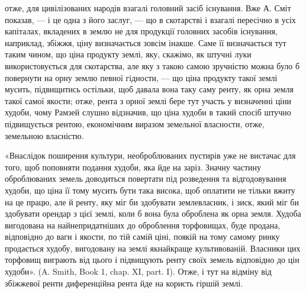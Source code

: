 \parcont{}  %
отже, для цивілізованих народів взагалі головний засіб існування. Вже А. Сміт
показав, — і це одна з його заслуг, — що в скотарстві і взагалі пересічно в
усіх капіталах, вкладених в землю не для продукції головних засобів існування,
наприклад, збіжжя, ціну визначається зовсім інакше. Саме її визначається
тут таким чином, що ціна продукту землі, яку, скажімо, як штучні луки використовується
для скотарства, але яку з такою самою зручністю можна було б
повернути на орну землю певної гідности, — що ціна продукту такої землі мусить,
підвищитись остільки, щоб давала вона таку саму ренту, як орна земля такої
самої якости; отже, рента з орної землі бере тут участь у визначенні ціни худоби,
чому Рамзей слушно відзначив, що ціна худоби в такий спосіб штучно
підвищується рентою, економічним виразом земельної власности, отже, земельною
власністю.

«Внаслідок поширення культури, необроблюваних пустирів уже не вистачає
для того, щоб поповняти подання худоби, яка йде на заріз. Значну частину
оброблюваних земель доводиться повертати під розведення та відгодовування
худоби, що ціна її тому мусить бути така висока, щоб оплатити не
тільки вжиту на це працю, але й ренту, яку міг би здобувати землевласник,
і зиск, який міг би здобувати орендар з цієї землі, коли б вона була
оброблена як орна земля. Худоба вигодована на найнепридатніших до оброблення
торфовищах, буде продана, відповідно до ваги і якости, по тій самій ціні, поякій
на тому самому ринку продається худобу, вигодовану на землі якнайкраще
культивованій. Власники цих торфовищ виграють від цього і підвищують ренту
своїх земель відповідно до цін худоби». (A. Smith, Book 1, chap. XI, part. I).
Отже, і тут на відміну від збіжжевої ренти диференційна рента йде на користь
гіршій землі.

